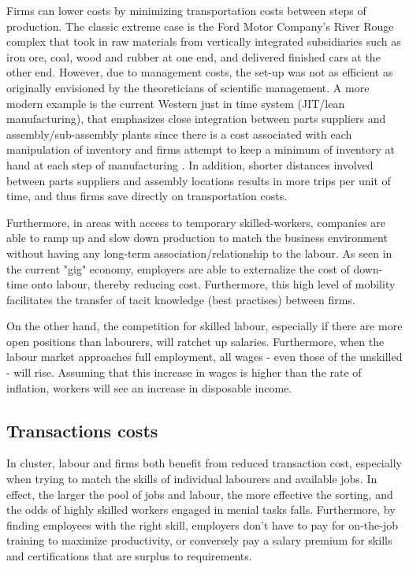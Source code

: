 \documentclass[12pt,letterpaper,notitlepage,onecolumn,final,openbib]{article}
\begin{document}
	Firms can lower costs by minimizing transportation costs between steps of production.  The classic extreme case is the Ford Motor Company's River Rouge complex that took in raw materials from vertically integrated subsidiaries such as iron ore, coal, wood and rubber at one end, and delivered finished cars at the other end.  However, due to management costs, the set-up was not as efficient as originally envisioned by the theoreticians of scientific management. A more modern example is the current Western just in time system (JIT/lean manufacturing), that emphasizes close integration between parts suppliers and assembly/sub-assembly plants since there is a cost associated with each manipulation of inventory and firms attempt to keep a minimum of inventory at hand at each step of manufacturing \cite{Hallihan_JIT_1997}.  In addition, shorter distances involved between parts suppliers and assembly locations results in more trips per unit of time, and thus firms save directly on transportation costs. \cite{HeuvelLangenDonselaarEtAl2014}   
	
	
	Furthermore, in areas with access to temporary skilled-workers, companies are able to ramp up and slow down production to match the business environment without having any long-term association/relationship to the labour. As seen in the current "gig" economy, employers are able to externalize the cost of down-time onto labour, thereby reducing cost.  Furthermore, this high level of mobility facilitates the transfer of tacit knowledge (best practises) between firms.  
	
	On the other hand, the competition for skilled labour, especially if there are more open positions than labourers, will ratchet up salaries.  Furthermore, when the labour market approaches full employment, all wages - even those of the unskilled - will rise.  Assuming that this increase in wages is higher than the rate of inflation, workers will see an increase in disposable income.  
	
	\subsection{Transactions costs}
	
	In cluster, labour and firms both benefit from reduced transaction cost, especially when trying to match the skills of individual labourers and available jobs.  In effect, the larger the pool of jobs and labour, the more effective the sorting, and the odds of highly skilled workers engaged in menial tasks falls.  Furthermore, by finding employees with the right skill, employers don't have to pay for on-the-job training to maximize productivity, or conversely pay a salary premium for skills and certifications that are surplus to requirements.  
	
\end{document}
